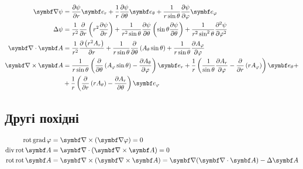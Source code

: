 \begin{align}\label{spheric}
	\vect{\nabla}\psi & = \frac{\partial \psi}{\partial r} \vect{e}_{r} + \frac{1}{r}\frac{\partial \psi}{\partial \theta} \vect{e}_{\theta} + \frac{1}{r\sin\theta}\frac{\partial \psi}{\partial \phi} \vect{e}_{\phi}                                                                                                            \\
	\Laplasian\psi    & = \frac{1}{r^2} \frac{\partial}{\partial r} \left( r^2 \frac{\partial \psi}{\partial r} \right) + \frac{1}{r^2 \sin \theta} \frac{\partial \psi}{\partial \theta} \left( \sin \theta \frac{\partial \psi}{\partial \theta} \right) + \frac{1}{r^2\sin^2 \theta} \frac{\partial^2 \psi}{\partial \varphi^2} \\
	\divg\vect{A}     & =\frac{1}{r^2}\frac{\partial \left(r^2A_r\right)}{\partial r}
	+
	\frac{1}{r\sin \theta }\frac{\partial}{\partial \theta }\left(A_{\theta }\sin \theta \right)
	+
	\frac{1}{r\sin\theta}\frac{\partial A_{\varphi}}{\partial \varphi }                                                                                                                                                                                                                                                            \\
	\rot\vect{A}      & = \frac{1}{r\sin \theta }\left(\frac{\partial}{\partial \theta }\left(A_{\varphi }\sin \theta \right)-\frac{\partial A_{\theta }}{\partial \varphi }\right)\vect{e}_{r}
	+
	\frac{1}{r}\left(\frac{1}{\sin \theta }\frac{\partial A_{r}}{\partial \varphi }-\frac{\partial}{\partial r}\left(rA_{\varphi }\right)\right)\vect{e}_{\theta}
	+ \nonumber                                                                                                                                                                                                                                                                                                                    \\
	                  & + \frac{1}{r}\left(\frac{\partial}{\partial r}\left(rA_{\theta }\right)-\frac{\partial A_{r}}{\partial \theta }\right)\vect{e}_{\phi}
\end{align}


\subsection{Другі похідні}

\begin{align}
	\mathrm{rot}\,\mathrm{grad}\,\phi    & = \rot(\vect{\nabla}\phi)  = 0                                             \\
	\mathrm{div}\,\mathrm{rot}\,\vect{A} & = \divg(\rot\vect{A})  = 0                                                 \\
	\mathrm{rot}\,\mathrm{rot}\,\vect{A} & = \rot(\rot\vect{A})  = \vect{\nabla}(\divg\vect{A}) - \Laplasian \vect{A}
\end{align}


